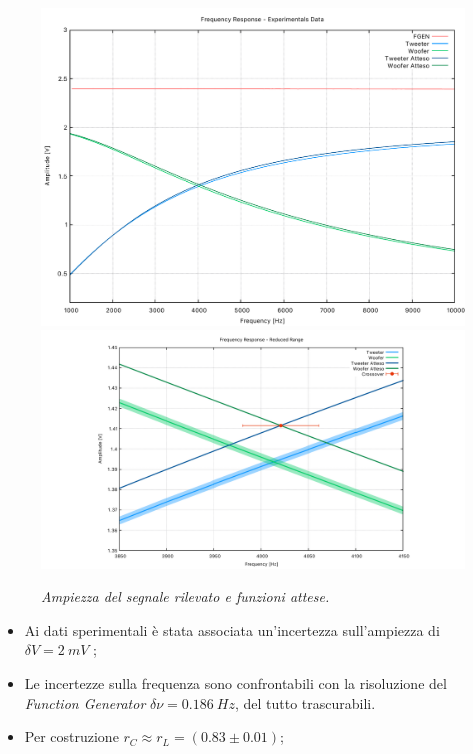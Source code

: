\documentclass{beamer}
\begin{document}
\begin{frame}
    \begin{figure}
        \includegraphics[width=0.45\linewidth]{../results/CFAmpl.pdf}
        \includegraphics[width=0.45\linewidth]{../results/CFAmplRR.pdf}
        \caption{\textit{Ampiezza del segnale rilevato e funzioni attese.}}
    \end{figure}
    \begin{itemize}
        \item <1-> Ai dati sperimentali è stata associata un'incertezza sull'ampiezza di $\delta V =  2 \ mV$ ;
        \item <2-> Le incertezze sulla frequenza sono confrontabili con la risoluzione del \textit{Function Generator} $\delta \nu = 0.186 \ Hz$, del tutto trascurabili.
        \item <3-> Per costruzione $r_C \approx r_L = (0.83 \pm 0.01) $;
    \end{itemize}
\end{frame}
\end{document}
